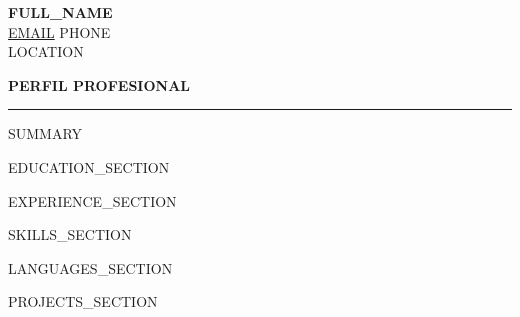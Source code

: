 \documentclass[letterpaper,10pt]{article}
\newcommand{\resumesection}[1]{
    \vspace{0.35em}
    \textbf{\normalsize #1}
    \vspace{0.1em}
    \hrule
    \vspace{0.3em}
}
\begin{document}
{\Large \textbf{{{FULL_NAME}}}} \\
\href{mailto:{{EMAIL}}}{{{EMAIL}}} \hfill {{PHONE}} \\
{{LOCATION}}

\vspace{0.3em}

\resumesection{PERFIL PROFESIONAL}

{{SUMMARY}}

{{EDUCATION_SECTION}}

{{EXPERIENCE_SECTION}}

{{SKILLS_SECTION}}

{{LANGUAGES_SECTION}}

{{PROJECTS_SECTION}}
\end{document}

